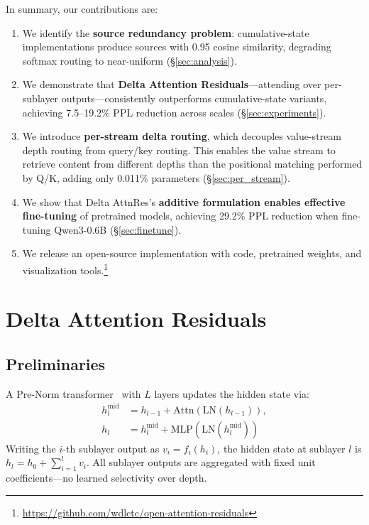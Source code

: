 \documentclass{article}
\begin{document}
In summary, our contributions are:
\begin{enumerate}
    \item We identify the \textbf{source redundancy problem}: cumulative-state implementations produce sources with 0.95 cosine similarity, degrading softmax routing to near-uniform (\S\ref{sec:analysis}).
    \item We demonstrate that \textbf{Delta Attention Residuals}---attending over per-sublayer outputs---consistently outperforms cumulative-state variants, achieving 7.5--19.2\% PPL reduction across scales (\S\ref{sec:experiments}).
    \item We introduce \textbf{per-stream delta routing}, which decouples value-stream depth routing from query/key routing. This enables the value stream to retrieve content from different depths than the positional matching performed by Q/K, adding only 0.011\% parameters (\S\ref{sec:per_stream}).
    \item We show that Delta AttnRes's \textbf{additive formulation enables effective fine-tuning} of pretrained models, achieving 29.2\% PPL reduction when fine-tuning Qwen3-0.6B (\S\ref{sec:finetune}).
    \item We release an open-source implementation with code, pretrained weights, and visualization tools.\footnote{\url{https://github.com/wdlctc/open-attention-residuals}}
\end{enumerate}

\section{Delta Attention Residuals}
\label{sec:method}

\subsection{Preliminaries}

A Pre-Norm transformer~\citep{vaswani2017attention,xiong2020prenorm} with $L$ layers updates the hidden state via:
\begin{align}
    h_l^{\mathrm{mid}} &= h_{l-1} + \mathrm{Attn}(\mathrm{LN}(h_{l-1})), \label{eq:attn_update} \\
    h_l &= h_l^{\mathrm{mid}} + \mathrm{MLP}(\mathrm{LN}(h_l^{\mathrm{mid}})) \label{eq:mlp_update}
\end{align}
Writing the $i$-th sublayer output as $v_i = f_i(h_i)$, the hidden state at sublayer $l$ is $h_l = h_0 + \sum_{i=1}^{l} v_i$. All sublayer outputs are aggregated with fixed unit coefficients---no learned selectivity over depth.
\end{document}
